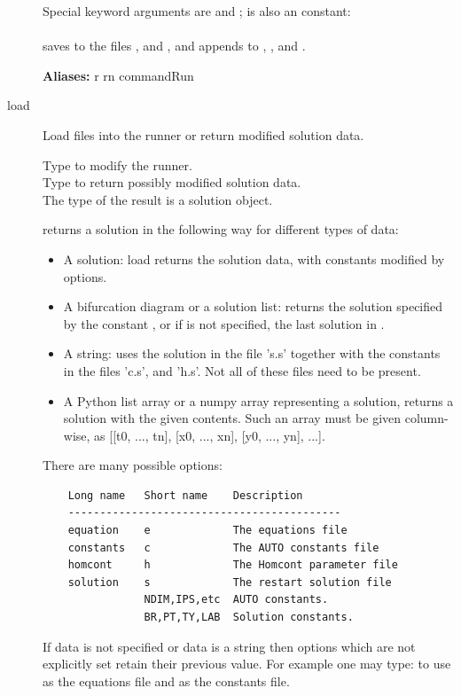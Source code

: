 \documentclass[12pt]{report}
\begin{document}
\begin{description}
    Special keyword arguments are  and ;  is also an \AUTO
    constant:\\
    \\
    saves to the files ,  and ,
    and appends to , , and .

    \textbf{Aliases:} r rn commandRun

\item[load]
Load files into the \AUTO runner or return modified solution data.

    Type  to modify the \AUTO runner.\\
    Type  to return possibly
    modified solution data.\\

    The type of the result is a solution object.

     returns a solution in the following way for
    different types of data:
    \begin{itemize}
    \item
      A solution: load returns the solution data, with \AUTO constants
      modified by options.
    \item
      A bifurcation diagram or a solution list:
      returns the solution specified by
      the \AUTO constant , or if  is not specified, the last solution
      in .
    \item
      A string: \AUTO uses the solution in the file 's.s' together with the
      constants in the files 'c.s', and 'h.s'. Not all of these
      files need to be present.
    \item
      A Python list array or a numpy array representing a solution,
      returns a solution with the given contents. Such an array must be given
      column-wise, as [[t0, ..., tn], [x0, ..., xn], [y0, ..., yn], ...].
    \end{itemize}

    There are many possible options:
    \begin{verbatim}
    Long name   Short name    Description
    -------------------------------------------
    equation    e             The equations file
    constants   c             The AUTO constants file
    homcont     h             The Homcont parameter file
    solution    s             The restart solution file
                NDIM,IPS,etc  AUTO constants.
                BR,PT,TY,LAB  Solution constants.
    \end{verbatim}
    If data is not specified or data is a string then options which
    are not explicitly set retain their previous value.
    For example one may type:  to use  as
    the equations file and  as the constants file.


\end{description}
\end{document}
